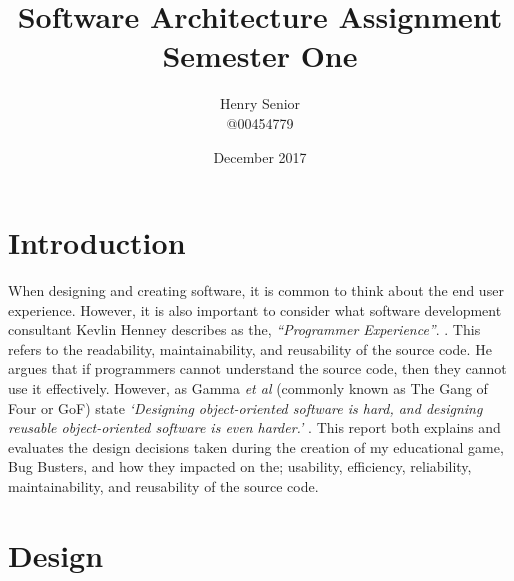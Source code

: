 \documentclass[a4paper,12pt]{article}
\begin{document}
	
\title{Software Architecture Assignment Semester One}
\author{Henry Senior\\@00454779}
\date{December 2017}

\maketitle

\section*{Introduction}
When designing and creating software, it is common to think about the end user experience. However, it is also important to consider what software development consultant Kevlin Henney describes as the, \textit{``Programmer Experience''}. \cite{FizzBuzz}. This refers to the readability, maintainability, and reusability of the source code. He argues that if programmers cannot understand the source code, then they cannot use it effectively. However, as Gamma \textit{et al} (commonly known as The Gang of Four or GoF) state \textit{`Designing object-oriented software is hard, and designing reusable object-oriented software is even harder.'} \cite{GoF-Book}. This report both explains and evaluates the design decisions taken during the creation of my educational game, Bug Busters, and how they impacted on the; usability, efficiency, reliability, maintainability, and reusability of the source code. 

\section*{Design}
\end{document}
